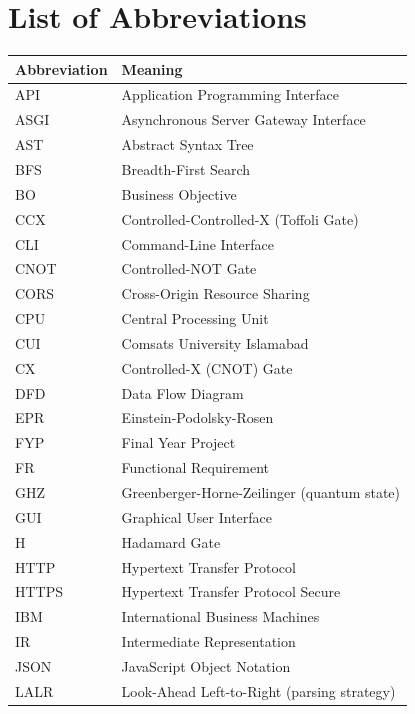 \chapter*{List of Abbreviations}

\begin{longtable}{p{3.5cm} p{10cm}}
\textbf{Abbreviation} & \textbf{Meaning} \\
\hline
\endhead

API   & Application Programming Interface \\
ASGI  & Asynchronous Server Gateway Interface \\
AST   & Abstract Syntax Tree \\
BFS   & Breadth-First Search \\
BO    & Business Objective \\
CCX   & Controlled-Controlled-X (Toffoli Gate) \\
CLI   & Command-Line Interface \\
CNOT  & Controlled-NOT Gate \\
CORS  & Cross-Origin Resource Sharing \\
CPU   & Central Processing Unit \\
CUI   & Comsats University Islamabad \\
CX    & Controlled-X (CNOT) Gate \\
DFD   & Data Flow Diagram \\
EPR   & Einstein-Podolsky-Rosen \\
FYP   & Final Year Project \\
FR    & Functional Requirement \\
GHZ   & Greenberger-Horne-Zeilinger (quantum state) \\
GUI   & Graphical User Interface \\
H     & Hadamard Gate \\
HTTP  & Hypertext Transfer Protocol \\
HTTPS & Hypertext Transfer Protocol Secure \\
IBM   & International Business Machines \\
IR    & Intermediate Representation \\
JSON  & JavaScript Object Notation \\
LALR  & Look-Ahead Left-to-Right (parsing strategy) \\

\end{longtable}

